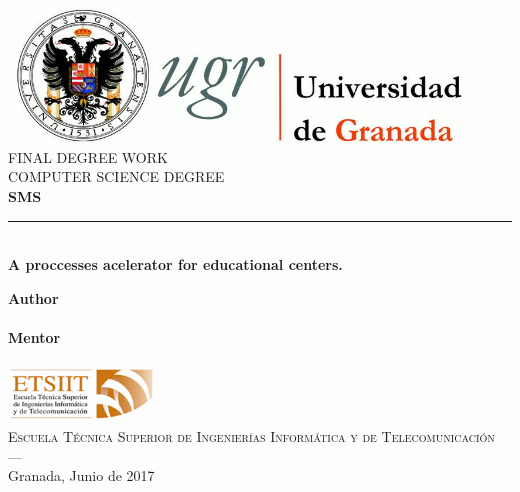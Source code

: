\begin{titlepage}


\newlength{\centeroffset}
\setlength{\centeroffset}{-0.5\oddsidemargin}
\addtolength{\centeroffset}{0.5\evensidemargin}
\thispagestyle{empty}

\noindent\hspace*{\centeroffset}\begin{minipage}{\textwidth}

\centering
\includegraphics[width=0.9\textwidth]{img/logo_ugr.jpg}\\[1.4cm]

\textsc{ \Large FINAL DEGREE WORK \\[0.2cm]}
\textsc{ COMPUTER SCIENCE DEGREE }\\[1cm]
%
{\Huge\bfseries SMS\\
}
\noindent\rule[-1ex]{\textwidth}{3pt}\\[3.5ex]
{\large\bfseries A proccesses acelerator for educational centers.}
\end{minipage}

\vspace{2.5cm}
\noindent\hspace*{\centeroffset}\begin{minipage}{\textwidth}
\centering

\textbf{Author}\\ {\myName}\\[2.5ex]
\textbf{Mentor}\\
{\myMentor}\\[2cm]
\includegraphics[width=0.3\textwidth]{img/etsiit_logo.png}\\[0.1cm]
\textsc{Escuela Técnica Superior de Ingenierías Informática y de Telecomunicación}\\
\textsc{---}\\
Granada, Junio de 2017
\end{minipage}
\end{titlepage}
